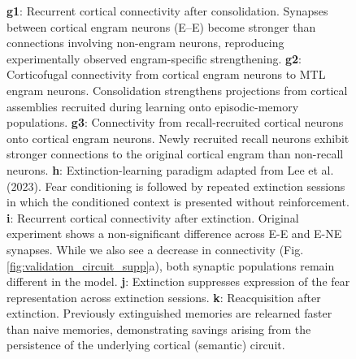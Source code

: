 \documentclass{article}
\begin{document}
\begin{figure}[h!]
{\textbf{g1}: Recurrent cortical connectivity after consolidation. Synapses between cortical engram neurons (E–E) become stronger than connections involving non-engram neurons, reproducing experimentally observed engram-specific strengthening.
\textbf{g2}: Corticofugal connectivity from cortical engram neurons to MTL engram neurons. Consolidation strengthens projections from cortical assemblies recruited during learning onto episodic-memory populations.
\textbf{g3}: Connectivity from recall-recruited cortical neurons onto cortical engram neurons. Newly recruited recall neurons exhibit stronger connections to the original cortical engram than non-recall neurons.
\textbf{h}: Extinction-learning paradigm adapted from Lee et al. (2023). Fear conditioning is followed by repeated extinction sessions in which the conditioned context is presented without reinforcement.
\textbf{i}: Recurrent cortical connectivity after extinction. Original experiment shows a non-significant difference across E-E and E-NE synapses. While we also see a decrease in connectivity (Fig. \ref{fig:validation_circuit_supp}a), both synaptic populations remain different in the model.
\textbf{j}: Extinction suppresses expression of the fear representation across extinction sessions.
\textbf{k}: Reacquisition after extinction. Previously extinguished memories are relearned faster than naive memories, demonstrating savings arising from the persistence of the underlying cortical (semantic) circuit.}
\end{figure}
\newpage
\end{document}
